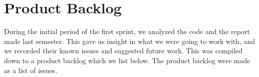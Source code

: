 \section{Product Backlog}\label{sec:spr1_prodback}
During the initial period of the first sprint, we analyzed the code and the report made last semester. This gave us insight in what we were going to work with, and we recorded their known issues and suggested future work. This was compiled down to a product backlog which we list below. The product backlog were made as a list of issues.

